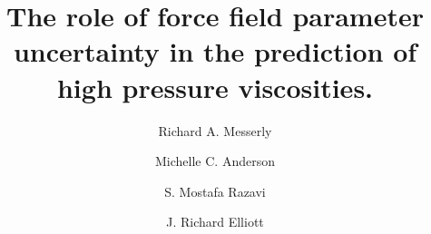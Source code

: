 \documentclass[preprint,review,12pt]{elsarticle}
\begin{document}
	
	\begin{frontmatter}
		
		
		
		\title{The role of force field parameter uncertainty in the prediction of high pressure viscosities.}
		
		
		\author{Richard A. Messerly}
		\address{Thermodynamics Research Center, National Institute of Standards and Technology, Boulder, Colorado, 80305}
		
		\author{Michelle C. Anderson}
		\address{Thermodynamics Research Center, National Institute of Standards and Technology, Boulder, Colorado, 80305}
		
		\author{S. Mostafa Razavi}
		\address{Department of Chemical and Biomolecular Engineering, The University of Akron, Akron, Ohio, 44325-3906}
		
		\author{J. Richard Elliott}
		\address{Department of Chemical and Biomolecular Engineering, The University of Akron, Akron, Ohio, 44325-3906}
		

\end{frontmatter}
\end{document}
